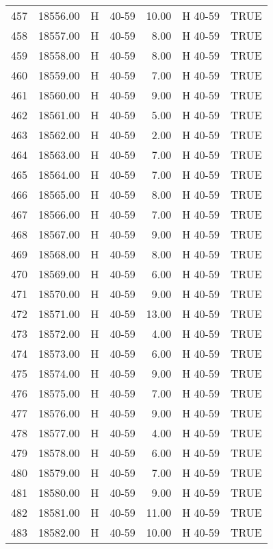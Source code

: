 \begin{table}[ht]
\begin{tabular}{rrllrll}
  457 & 18556.00 & H & 40-59 & 10.00 & H 40-59 & TRUE \\ 
  458 & 18557.00 & H & 40-59 & 8.00 & H 40-59 & TRUE \\ 
  459 & 18558.00 & H & 40-59 & 8.00 & H 40-59 & TRUE \\ 
  460 & 18559.00 & H & 40-59 & 7.00 & H 40-59 & TRUE \\ 
  461 & 18560.00 & H & 40-59 & 9.00 & H 40-59 & TRUE \\ 
  462 & 18561.00 & H & 40-59 & 5.00 & H 40-59 & TRUE \\ 
  463 & 18562.00 & H & 40-59 & 2.00 & H 40-59 & TRUE \\ 
  464 & 18563.00 & H & 40-59 & 7.00 & H 40-59 & TRUE \\ 
  465 & 18564.00 & H & 40-59 & 7.00 & H 40-59 & TRUE \\ 
  466 & 18565.00 & H & 40-59 & 8.00 & H 40-59 & TRUE \\ 
  467 & 18566.00 & H & 40-59 & 7.00 & H 40-59 & TRUE \\ 
  468 & 18567.00 & H & 40-59 & 9.00 & H 40-59 & TRUE \\ 
  469 & 18568.00 & H & 40-59 & 8.00 & H 40-59 & TRUE \\ 
  470 & 18569.00 & H & 40-59 & 6.00 & H 40-59 & TRUE \\ 
  471 & 18570.00 & H & 40-59 & 9.00 & H 40-59 & TRUE \\ 
  472 & 18571.00 & H & 40-59 & 13.00 & H 40-59 & TRUE \\ 
  473 & 18572.00 & H & 40-59 & 4.00 & H 40-59 & TRUE \\ 
  474 & 18573.00 & H & 40-59 & 6.00 & H 40-59 & TRUE \\ 
  475 & 18574.00 & H & 40-59 & 9.00 & H 40-59 & TRUE \\ 
  476 & 18575.00 & H & 40-59 & 7.00 & H 40-59 & TRUE \\ 
  477 & 18576.00 & H & 40-59 & 9.00 & H 40-59 & TRUE \\ 
  478 & 18577.00 & H & 40-59 & 4.00 & H 40-59 & TRUE \\ 
  479 & 18578.00 & H & 40-59 & 6.00 & H 40-59 & TRUE \\ 
  480 & 18579.00 & H & 40-59 & 7.00 & H 40-59 & TRUE \\ 
  481 & 18580.00 & H & 40-59 & 9.00 & H 40-59 & TRUE \\ 
  482 & 18581.00 & H & 40-59 & 11.00 & H 40-59 & TRUE \\ 
  483 & 18582.00 & H & 40-59 & 10.00 & H 40-59 & TRUE \\ 

\end{tabular}
\end{table}
